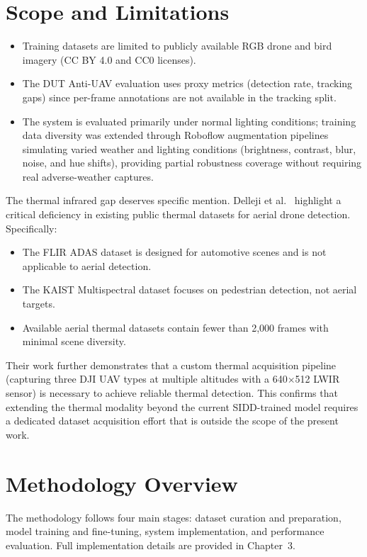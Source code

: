 \documentclass[12pt,a4paper]{report}
\begin{document}
\section{Scope and Limitations}

\begin{itemize}
  \item Training datasets are limited to publicly available RGB drone and
        bird imagery (CC BY 4.0 and CC0 licenses).
  \item The DUT Anti-UAV evaluation uses proxy metrics (detection rate,
        tracking gaps) since per-frame annotations are not available in
        the tracking split.
  \item The system is evaluated primarily under normal lighting conditions;
        training data diversity was extended through Roboflow augmentation
        pipelines simulating varied weather and lighting conditions
        (brightness, contrast, blur, noise, and hue shifts), providing
        partial robustness coverage without requiring real adverse-weather
        captures.
\end{itemize}

The thermal infrared gap deserves specific mention. Delleji et al.~\cite{delleji2025thermal}
highlight a critical deficiency in existing public thermal datasets for aerial drone detection.
Specifically:
\begin{itemize}
  \item The FLIR ADAS dataset is designed for automotive scenes and is not applicable to aerial detection.
  \item The KAIST Multispectral dataset focuses on pedestrian detection, not aerial targets.
  \item Available aerial thermal datasets contain fewer than 2,000 frames with minimal scene diversity.
\end{itemize}
Their work further demonstrates that a custom thermal acquisition pipeline (capturing three
DJI UAV types at multiple altitudes with a 640$\times$512 LWIR sensor) is necessary to
achieve reliable thermal detection. This confirms that extending the thermal modality beyond
the current SIDD-trained model requires a dedicated dataset acquisition effort that is outside
the scope of the present work.

\section{Methodology Overview}

The methodology follows four main stages: dataset curation and preparation,
model training and fine-tuning, system implementation, and performance
evaluation. Full implementation details are provided in Chapter~3.
\end{document}

